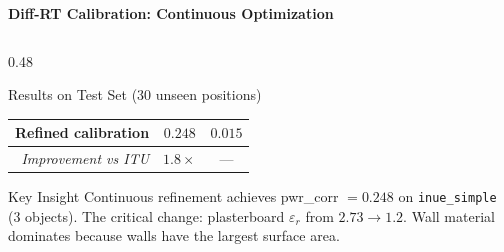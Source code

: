 \documentclass[
    aspectratio=169
]{beamer}
\begin{document}
\begin{frame}{\textbf{Diff-RT Calibration: Continuous Optimization}}
\begin{columns}[T]
\begin{column}{0.48\textwidth}
\begin{block}{\footnotesize Results on Test Set (30 unseen positions)}
\begin{tabular}{rcc}
\rowcolor{green!15} \textbf{Refined calibration} & $\mathbf{0.248}$ & $0.015$ \\
\midrule
\textit{Improvement vs ITU} & $1.8\times$ & --- \\
\bottomrule
\end{tabular}
\end{block}
\normalsize
\vspace{0.1cm}
\begin{block}{\footnotesize Key Insight}
\footnotesize
Continuous refinement achieves pwr\_corr $= 0.248$ on \texttt{inue\_simple} (3 objects). The critical change: plasterboard $\varepsilon_r$ from $2.73 \to 1.2$. Wall material dominates because walls have the largest surface area.
\end{block}
\end{column}
\end{columns}
\end{frame}

\end{document}
